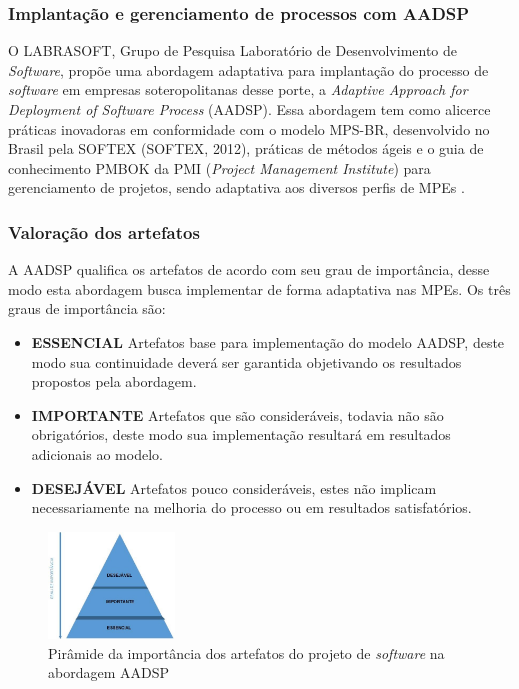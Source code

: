 \documentclass{acm_proc_article-sp}
\begin{document}
\subsubsection{Implantação e gerenciamento de processos com AADSP}
O LABRASOFT, Grupo de Pesquisa Laboratório de Desenvolvimento de \textit{Software}, propõe uma abordagem adaptativa para implantação do processo de \textit{software} em empresas soteropolitanas desse porte, a \textit{Adaptive Approach for Deployment of Software Process} (AADSP). Essa abordagem tem como alicerce práticas inovadoras em conformidade com o modelo MPS-BR, desenvolvido no Brasil pela SOFTEX (SOFTEX, 2012), práticas de métodos ágeis e o guia de conhecimento PMBOK da PMI (\textit{Project Management Institute}) para gerenciamento de projetos, sendo adaptativa aos diversos perfis de MPEs \cite{aadsp:hibirdo}. 

\subsubsection*{Valoração dos artefatos}
A AADSP qualifica os artefatos de acordo com seu grau de importância, desse modo esta abordagem busca implementar de forma adaptativa nas MPEs. Os três graus de importância são:

\begin{itemize}
\item \textbf{ESSENCIAL} Artefatos base para implementação do modelo AADSP, deste modo sua continuidade deverá ser garantida objetivando os resultados propostos pela abordagem\cite{aadsp:hibirdo}.
\item \textbf{IMPORTANTE} Artefatos que são consideráveis, todavia não são obrigatórios, deste modo sua implementação resultará em resultados adicionais ao modelo\cite{aadsp:hibirdo}.
\item \textbf{DESEJÁVEL} Artefatos pouco consideráveis, estes não implicam necessariamente na melhoria do processo ou em resultados satisfatórios\cite{aadsp:hibirdo}.
\end{itemize}

\begin{figure}[h]
\centering %
\includegraphics[width=0.3\textwidth]{AADSP_Piramidade_de_importancia_dos_artefatos.jpg} %
\caption{Pirâmide da importância dos artefatos do projeto de \textit{software} na abordagem AADSP  \cite{aadsp:hibirdo}}
\end{figure}
\end{document}
